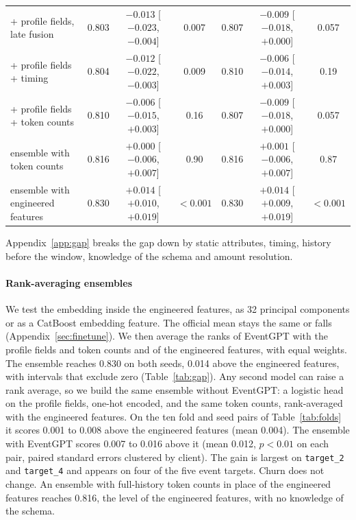 \documentclass[12pt]{article}
\newcommand{\tok}[1]{\texttt{#1}}
\begin{document}
\begin{table}[htbp]
{\begin{tabular}{lcccccc}
\quad + profile fields, late fusion & 0.803 & $-0.013$ [$-0.023$, $-0.004$] & 0.007 & 0.807 & $-0.009$ [$-0.018$, $+0.000$] & 0.057 \\
\quad + profile fields + timing & 0.804 & $-0.012$ [$-0.022$, $-0.003$] & 0.009 & 0.810 & $-0.006$ [$-0.014$, $+0.003$] & 0.19 \\
\quad + profile fields + token counts & 0.810 & $-0.006$ [$-0.015$, $+0.003$] & 0.16 & 0.807 & $-0.009$ [$-0.018$, $+0.000$] & 0.057 \\
\midrule
ensemble with token counts & 0.816 & $+0.000$ [$-0.006$, $+0.007$] & 0.90 & 0.816 & $+0.001$ [$-0.006$, $+0.007$] & 0.87 \\
ensemble with engineered features & 0.830 & $+0.014$ [$+0.010$, $+0.019$] & $<0.001$ & 0.830 & $+0.014$ [$+0.009$, $+0.019$] & $<0.001$ \\
\bottomrule
\end{tabular}}
\end{table}

Appendix~\ref{app:gap} breaks the gap down by static attributes, timing, history before the window, knowledge of the schema and amount resolution.

\paragraph{Rank-averaging ensembles} We test the embedding inside the engineered features, as 32 principal components or as a CatBoost embedding feature. The official mean stays the same or falls (Appendix~\ref{sec:finetune}). We then average the ranks of EventGPT with the profile fields and token counts and of the engineered features, with equal weights. The ensemble reaches 0.830 on both seeds, 0.014 above the engineered features, with intervals that exclude zero (Table~\ref{tab:gap}). Any second model can raise a rank average, so we build the same ensemble without EventGPT: a logistic head on the profile fields, one-hot encoded, and the same token counts, rank-averaged with the engineered features. On the ten fold and seed pairs of Table~\ref{tab:folds} it scores 0.001 to 0.008 above the engineered features (mean 0.004). The ensemble with EventGPT scores 0.007 to 0.016 above it (mean 0.012, $p < 0.01$ on each pair, paired standard errors clustered by client). The gain is largest on \tok{target\_2} and \tok{target\_4} and appears on four of the five event targets. Churn does not change. An ensemble with full-history token counts in place of the engineered features reaches 0.816, the level of the engineered features, with no knowledge of the schema.
\end{document}
